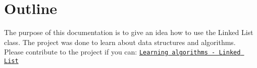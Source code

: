 \hypertarget{index_outline}{}\section{Outline}\label{index_outline}
The purpose of this documentation is to give an idea how to use the Linked List class. The project was done to learn about data structures and algorithms. ~\newline
Please contribute to the project if you can\+: \href{https://github.com/venkisagunner93/learning_algorithms/tree/master/LinkedList}{\tt Learning algorithms -\/ Linked List} 